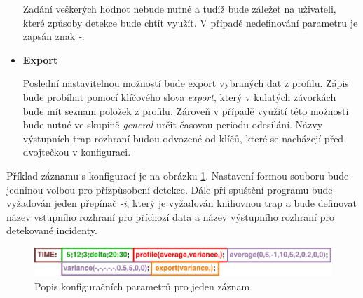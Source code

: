 \begin{itemize}
  Zadání veškerých hodnot nebude nutné a tudíž bude záležet na uživateli, které způsoby detekce 
  bude chtít využít. V případě nedefinování parametru je zapsán znak \textit{-}.
  
  \item \textbf{Export}
  
  Poslední nastavitelnou možností bude export vybraných dat z profilu. Zápis bude probíhat pomocí 
  klíčového slova \textit{export}, který v kulatých závorkách bude mít seznam položek z profilu. Zároveň 
  v případě využití této možnosti bude nutné ve skupině \textit{general} určit časovou periodu
  odesílání.
  Názvy výstupních trap rozhraní
  budou odvozené od klíčů, které se nacházejí před dvojtečkou v konfiguraci.
  
 \end{itemize}

 Příklad záznamu s konfigurací je na obrázku \ref{obr.config}. Nastavení formou
 souboru bude jedninou volbou pro přizpůsobení detekce. Dále při 
 spuštění programu bude vyžadován jeden přepínač \textit{-i}, který je vyžadován knihovnou trap a 
 bude definovat název vstupního
 rozhraní pro příchozí data a název výstupního rozhraní pro detekované incidenty. 
 
   \begin{figure}[ht]
   \begin{center}
   \includegraphics[scale=0.5]{pictures/config-file-frame}
   \caption{Popis konfiguračních parametrů pro jeden záznam}
   \label{obr.config}
   \end{center}
   \end{figure}
 
